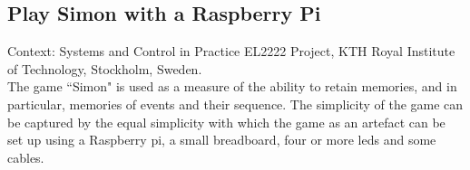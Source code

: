 \subsection{Play Simon with a Raspberry Pi}

Context: Systems and Control in Practice EL2222 Project, KTH Royal Institute of
Technology, Stockholm, Sweden.\\

The game ``Simon" is used as a measure of the ability to retain memories, and in
particular, memories of events and their sequence. The simplicity of the game
can be captured by the equal simplicity with which the game as an artefact can
be set up using a Raspberry pi, a small breadboard, four or more leds
and some cables.
